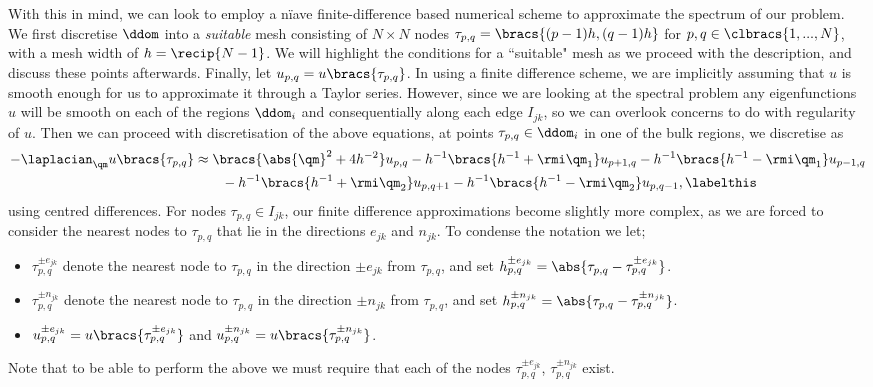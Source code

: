 With this in mind, we can look to employ a n{\"i}ave finite-difference based numerical scheme to approximate the spectrum of our problem.
We first discretise $\ddom$ into a \emph{suitable} mesh consisting of $N\times N$ nodes $\tau_{p,q} = \bracs{(p-1)h,(q-1)h}$ for $p,q\in\clbracs{1,...,N}$, with a mesh width of $h = \recip{N-1}$.
We will highlight the conditions for a ``suitable" mesh as we proceed with the description, and discuss these points afterwards.
Finally, let $u_{p,q} = u\bracs{\tau_{p,q}}$.
In using a finite difference scheme, we are implicitly assuming that $u$ is smooth enough for us to approximate it through a Taylor series.
However, since we are looking at the spectral problem any eigenfunctions $u$ will be smooth on each of the regions $\ddom_i$ and consequentially along each edge $I_{jk}$, so we can overlook concerns to do with regularity of $u$.
Then we can proceed with discretisation of the above equations, at points $\tau_{p,q}\in\ddom_i$ in one of the bulk regions, we discretise as
\begin{align*}
	-\laplacian_\qm u\bracs{\tau_{p,q}} &\approx 
	\bracs{\abs{\qm}^2 + 4h^{-2}}u_{p,q}
	-h^{-1}\bracs{h^{-1} + \rmi\qm_1}u_{p+1,q}
	-h^{-1}\bracs{h^{-1} - \rmi\qm_1}u_{p-1,q} \\
	&\qquad -h^{-1}\bracs{h^{-1} + \rmi\qm_2}u_{p,q+1}
	-h^{-1}\bracs{h^{-1} - \rmi\qm_2}u_{p,q-1}, \labelthis\label{eq:SI-FDMBulkDiscretise}
\end{align*}
using centred differences.
For nodes $\tau_{p,q}\in I_{jk}$, our finite difference approximations become slightly more complex, as we are forced to consider the nearest nodes to $\tau_{p,q}$ that lie in the directions $e_{jk}$ and $n_{jk}$.
To condense the notation we let;
\begin{itemize}
	\item $\tau_{p,q}^{\pm e_{jk}}$ denote the nearest node to $\tau_{p,q}$ in the direction $\pm e_{jk}$ from $\tau_{p,q}$, and set $h_{p,q}^{\pm e_{jk}} = \abs{ \tau_{p,q} - \tau_{p,q}^{\pm e_{jk}} }$.
	\item $\tau_{p,q}^{\pm n_{jk}}$ denote the nearest node to $\tau_{p,q}$ in the direction $\pm n_{jk}$ from $\tau_{p,q}$, and set $h_{p,q}^{\pm n_{jk}} = \abs{ \tau_{p,q} - \tau_{p,q}^{\pm n_{jk}} }$.
	\item $u_{p,q}^{\pm e_{jk}} = u\bracs{\tau_{p,q}^{\pm e_{jk}}}$ and $u_{p,q}^{\pm n_{jk}} = u\bracs{\tau_{p,q}^{\pm n_{jk}}}$.
\end{itemize}
Note that to be able to perform the above we must require that each of the nodes $\tau_{p,q}^{\pm e_{jk}}$, $\tau_{p,q}^{\pm n_{jk}}$ exist.
